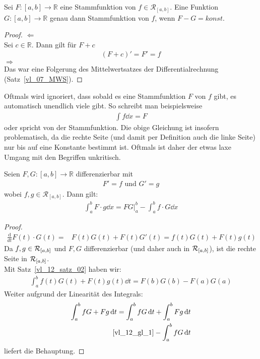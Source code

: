 \begin{Proposition}{
	Sei $F: [a,b] \rightarrow \mathbb{R}$ eine Stammfunktion von $f \in \mathcal{R}
	_{[a,b]}$. Eine Funktion $G: [a,b] \rightarrow \mathbb{R}$ genau dann 
	Stammfunktion von $f$, wenn $F-G = konst.$
}\end{Proposition}

\begin{proof}
	 $\Leftarrow$ \\
	Sei $c \in \mathbb{R}$. Dann gilt für $F + c$ 
	\begin{align*}
		(F+ c)' = F' = f
	\end{align*}
	$\Rightarrow$ \\
	Das war eine Folgerung des Mittelwertsatzes der Differentialrechnung 
	(Satz~\ref{vl_07_MWS}).
\end{proof}

\begin{Bemerkung}{
	Oftmals wird ignoriert, dass sobald es eine Stammfunktion $F$ von $f$ gibt, es 
	automatisch unendlich viele gibt. So schreibt man beispielsweise 
	\begin{align*}
		\int f \dd{x} = F
	\end{align*} 
	oder spricht von \glqq der\grqq{} Stammfunktion. Die obige Gleichung ist
	 insofern problematisch, da die rechte Seite (und damit per Definition auch die 
	 linke Seite) nur bis auf eine Konstante bestimmt ist. Oftmals ist daher der 
	 etwas laxe Umgang mit den Begriffen unkritisch.
}\end{Bemerkung}

\begin{Satz}{\label{vl_12_satz_03}
	Seien $F,G: [a,b] \rightarrow \mathbb{R}$ differenzierbar mit 
	\begin{align*}
		F' = f \text{ und } G' = g 
	\end{align*}
	wobei $f,g \in \mathcal{R}_{[a,b]}$. Dann gilt:
	\begin{align*}
		\int_a^b F \cdot g \dd{x} = FG\vert_a^b - \int_a^b f \cdot G \dd{x}
	\end{align*}
}\end{Satz}

\begin{proof}
	\begin{align}\label{vl_12_gl_1}
		\frac{\mathrm{d}}{dt}F(t)\cdot G(t) = & F(t)G(t) + F(t)G'(t) = 
		f(t)G(t) + F(t)g(t)
	\end{align}
	Da $f,g \in \mathcal{R}_{[{a},{b}]}$ und $F,G$ differenzierbar (und daher auch in 
	$\mathcal{R}_{[{a},{b}]}$), ist die rechte Seite in $\mathcal{R}_{[{a},{b}]}$. \\
	Mit Satz~\ref{vl_12_satz_02} haben wir:
	\begin{align*}
		\int_a^b f(t) G(t) + F(t)g(t) \dd{t} = F(b)G(b) -F(a)G(a)
	\end{align*}
	Weiter aufgrund der Linearität des Integrals:
	\begin{align*}
		\int_a^bfG + Fg \dd{t} = \int_a^b fG\dd{t} + \int_a^b Fg\dd{t} \\
		\ref{vl_12_gl_1}-\int_a^b fG\dd{t}
	\end{align*}
	liefert die Behauptung.
\end{proof}

